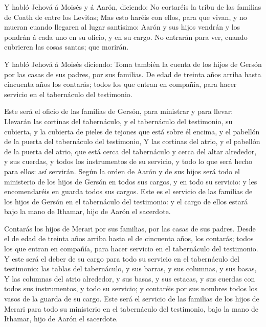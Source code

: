  Y habló Jehová á Moisés y á Aarón, diciendo: 
No cortaréis la tribu de las familias de Coath de entre los Levitas;
 Mas esto haréis con ellos, para que vivan, y no mueran
cuando llegaren al lugar santísimo: Aarón y sus hijos vendrán y los
pondrán á cada uno en su oficio, y en su cargo.  No
entrarán para ver, cuando cubrieren las cosas santas; que morirán.

 Y habló Jehová á Moisés diciendo:  Toma
también la cuenta de los hijos de Gersón por las casas de sus padres,
por sus familias.  De edad de treinta años arriba hasta
cincuenta años los contarás; todos los que entran en compañía, para
hacer servicio en el tabernáculo del testimonio.

 Este será el oficio de las familias de Gersón, para
ministrar y para llevar:  Llevarán las cortinas del
tabernáculo, y el tabernáculo del testimonio, su cubierta, y la cubierta
de pieles de tejones que está sobre él encima, y el pabellón de la
puerta del tabernáculo del testimonio,  Y las cortinas del
atrio, y el pabellón de la puerta del atrio, que está cerca del
tabernáculo y cerca del altar alrededor, y sus cuerdas, y todos los
instrumentos de su servicio, y todo lo que será hecho para ellos: así
servirán.  Según la orden de Aarón y de sus hijos será todo
el ministerio de los hijos de Gersón en todos sus cargos, y en todo su
servicio: y les encomendaréis en guarda todos sus cargos. 
Este es el servicio de las familias de los hijos de Gersón en el
tabernáculo del testimonio: y el cargo de ellos estará bajo la mano de
Ithamar, hijo de Aarón el sacerdote.

 Contarás los hijos de Merari por sus familias, por las
casas de sus padres.  Desde el de edad de treinta años
arriba hasta el de cincuenta años, los contarás; todos los que entran en
compañía, para hacer servicio en el tabernáculo del testimonio.
 Y este será el deber de su cargo para todo su servicio en
el tabernáculo del testimonio: las tablas del tabernáculo, y sus barras,
y sus columnas, y sus basas,  Y las columnas del atrio
alrededor, y sus basas, y sus estacas, y sus cuerdas con todos sus
instrumentos, y todo su servicio; y contaréis por sus nombres todos los
vasos de la guarda de su cargo.  Este será el servicio de
las familias de los hijos de Merari para todo su ministerio en el
tabernáculo del testimonio, bajo la mano de Ithamar, hijo de Aarón el
sacerdote.

